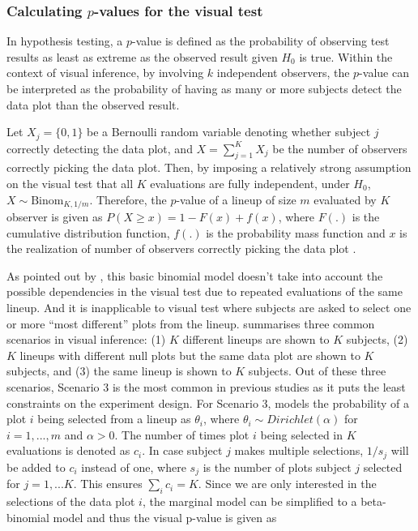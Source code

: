 \documentclass[]{interact}
\theoremstyle{plain}%
\theoremstyle{definition}
\theoremstyle{remark}
\begin{document}
\hypertarget{calculating-p-values-for-the-visual-test}{%
\subsubsection{\texorpdfstring{Calculating \(p\)-values for the visual
test}{Calculating p-values for the visual test}}\label{calculating-p-values-for-the-visual-test}}

In hypothesis testing, a \(p\)-value is defined as the probability of
observing test results as least as extreme as the observed result given
\(H_0\) is true. Within the context of visual inference, by involving
\(k\) independent observers, the \(p\)-value can be interpreted as the
probability of having as many or more subjects detect the data plot than
the observed result.

Let \(X_j = \{0,1\}\) be a Bernoulli random variable denoting whether
subject \(j\) correctly detecting the data plot, and
\(X = \sum_{j=1}^{K}X_j\) be the number of observers correctly picking
the data plot. Then, by imposing a relatively strong assumption on the
visual test that all \(K\) evaluations are fully independent, under
\(H_0\), \(X \sim \mathrm{Binom}_{K,1/m}\). Therefore, the \(p\)-value
of a lineup of size \(m\) evaluated by \(K\) observer is given as
\(P(X \geq x) = 1 - F(x) + f(x)\), where \(F(.)\) is the cumulative
distribution function, \(f(.)\) is the probability mass function and
\(x\) is the realization of number of observers correctly picking the
data plot \citep{majumder_validation_2013}.

As pointed out by \citet{vanderplas2021statistical}, this basic binomial
model doesn't take into account the possible dependencies in the visual
test due to repeated evaluations of the same lineup. And it is
inapplicable to visual test where subjects are asked to select one or
more ``most different'' plots from the lineup.
\citet{vanderplas2021statistical} summarises three common scenarios in
visual inference: (1) \(K\) different lineups are shown to \(K\)
subjects, (2) \(K\) lineups with different null plots but the same data
plot are shown to \(K\) subjects, and (3) the same lineup is shown to
\(K\) subjects. Out of these three scenarios, Scenario 3 is the most
common in previous studies as it puts the least constraints on the
experiment design. For Scenario 3, \citet{vanderplas2021statistical}
models the probability of a plot \(i\) being selected from a lineup as
\(\theta_i\), where \(\theta_i \sim Dirichlet(\alpha)\) for
\(i=1,...,m\) and \(\alpha > 0\). The number of times plot \(i\) being
selected in \(K\) evaluations is denoted as \(c_i\). In case subject
\(j\) makes multiple selections, \(1/s_j\) will be added to \(c_i\)
instead of one, where \(s_j\) is the number of plots subject \(j\)
selected for \(j=1,...K\). This ensures \(\sum_{i}c_i=K\). Since we are
only interested in the selections of the data plot \(i\), the marginal
model can be simplified to a beta-binomial model and thus the visual
p-value is given as
\end{document}
